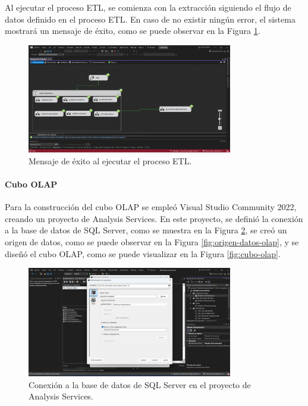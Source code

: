 Al ejecutar el proceso ETL, se comienza con la extracción siguiendo el flujo de datos definido en el proceso ETL. En caso de no
existir ningún error, el sistema mostrará un mensaje de éxito, como se puede observar en la Figura \ref{fig:exito-bi}.

\begin{figure}[H]
    \centering
    \includegraphics[width=0.8\textwidth]{chapters/III-resultados-y-discusion/resources/images/exito-bi.png}
    \caption{Mensaje de éxito al ejecutar el proceso ETL.}
    \label{fig:exito-bi}
\end{figure}

\paragraph{Cubo OLAP}
Para la construcción del cubo OLAP se empleó Visual Studio Community 2022, creando un proyecto de Analysis Services. En este
proyecto, se definió la conexión a la base de datos de SQL Server, como se muestra en la Figura \ref{fig:conexion-olap},
se creó un origen de datos, como se puede observar en la Figura \ref{fig:origen-datos-olap}, y se diseñó el cubo OLAP, como se
puede visualizar en la Figura \ref{fig:cubo-olap}.

\begin{figure}[H]
    \centering
    \includegraphics[width=0.8\textwidth]{chapters/III-resultados-y-discusion/resources/images/conexion-olap.png}
    \caption{Conexión a la base de datos de SQL Server en el proyecto de Analysis Services.}
    \label{fig:conexion-olap}
\end{figure}

